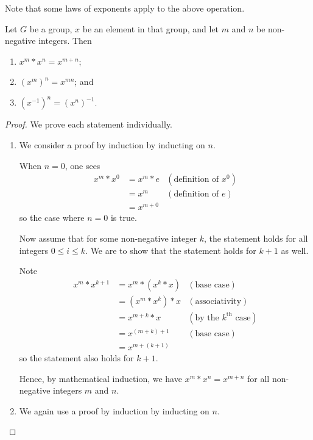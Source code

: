 Note that some laws of exponents apply to the above operation.
\begin{proposition}
    Let $G$ be a group, $x$ be an element in that group, and let $m$ and $n$ be non-negative integers. Then
    \begin{enumerate}
        \item $x^m \ast x^n = x^{m+n}$;
        \item $\left(x^m\right)^n = x^{mn}$; and
        \item $\left(x^{-1}\right)^n = \left(x^n\right)^{-1}$.
    \end{enumerate}
\end{proposition}
\begin{proof}
    We prove each statement individually.
    \begin{enumerate}
        \item We consider a proof by induction by inducting on $n$.
        
        When $n = 0$, one sees
        \begin{align*}
            x^m \ast x^0 &= x^m \ast e & (\text{definition of }x^0)\\
            &= x^m & (\text{definition of }e)\\
            &= x^{m+0}
        \end{align*}
        so the case where $n=0$ is true.

        Now assume that for some non-negative integer $k$, the statement holds for all integers $0 \leq i \leq k$. We are to show that the statement holds for $k+1$ as well.

        Note
        \begin{align*}
            x^m\ast x^{k+1} &= x^m\ast (x^k\ast x) & (\text{base case})\\
            &= (x^m \ast x^k) \ast x & (\text{associativity})\\
            &= x^{m+k}\ast x & (\text{by the }k^{\text{th}}\text{ case})\\
            &= x^{(m+k)+1} & (\text{base case})\\
            &= x^{m+(k+1)}
        \end{align*}
        so the statement also holds for $k+1$.

        Hence, by mathematical induction, we have $x^m \ast x^n = x^{m+n}$ for all non-negative integers $m$ and $n$.
        
        \item We again use a proof by induction by inducting on $n$.
        

\end{enumerate}
\end{proof}
